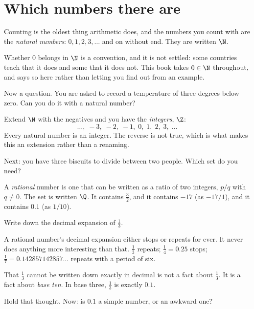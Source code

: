 \section{Which numbers there are}
\label{sec:F01-sets}

\begin{fr}
Counting is the oldest thing arithmetic does, and the numbers you count with
are the \emph{natural numbers}: $0, 1, 2, 3, \dots$ and on without end. They
are written $\N$.

Whether $0$ belongs in $\N$ is a convention, and it is not settled: some
countries teach that it does and some that it does not. This book takes
$0 \in \N$ throughout, and says so here rather than letting you find out from
an example.

Now a question. You are asked to record a temperature of three degrees below
zero. Can you do it with a natural number?
\nextframe
\end{fr}

\begin{fr}
Extend $\N$ with the negatives and you have the \emph{integers}, $\Z$:
\[ \dots,\; -3,\; -2,\; -1,\; 0,\; 1,\; 2,\; 3,\; \dots \]
Every natural number is an integer. The reverse is not true, which is what
makes this an extension rather than a renaming.

Next: you have three biscuits to divide between two people. Which set do you
need?
\nextframe
\end{fr}

\begin{fr}
A \emph{rational} number is one that can be written as a ratio of two integers,
$p/q$ with $q \ne 0$. The set is written $\Q$. It contains $\tfrac{3}{2}$, and
it contains $-17$ (as $-17/1$), and it contains $\num{0.1}$ (as $1/10$).

Write down the decimal expansion of $\tfrac{1}{3}$.
\nextframe
\end{fr}

\begin{fr}
A rational number's decimal expansion either stops or repeats for ever. It
never does anything more interesting than that. $\tfrac{1}{3}$ repeats;
$\tfrac{1}{4} = \num{0.25}$ stops; $\tfrac{1}{7} = \num{0.142857142857}\dots$ repeats
with a period of six.

That $\tfrac{1}{3}$ cannot be written down exactly in decimal is not a fact
about $\tfrac{1}{3}$. It is a fact about \emph{base ten}. In base three,
$\tfrac{1}{3}$ is exactly $\num{0.1}$.

Hold that thought. Now: is $\num{0.1}$ a simple number, or an awkward one?
\nextframe
\end{fr}

